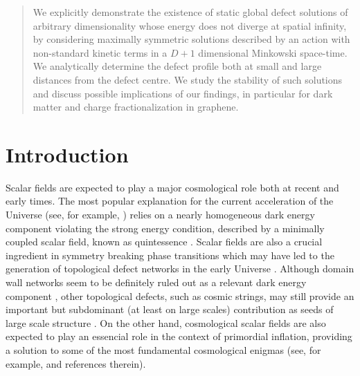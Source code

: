 \documentclass[prd,twocolumn,a4paper,superscriptaddress,floatfix]{revtex4}
\begin{document}
\begin{abstract}

We explicitly demonstrate the existence of static global defect solutions of arbitrary dimensionality whose energy does not diverge at spatial infinity, by considering maximally symmetric solutions described by an action with non-standard kinetic terms in a $D+1$ dimensional  Minkowski space-time. We analytically determine the defect profile both at small and large distances from the defect centre. We study the stability of such solutions and discuss possible implications of our findings, in particular for dark matter and charge fractionalization in graphene.

\end{abstract} 
\maketitle

\section{Introduction}

Scalar fields are expected to play a major cosmological role both at recent and early times. The most popular explanation for the current acceleration of the Universe (see, for example, \cite{Frieman:2008sn,Komatsu:2010fb}) relies on a nearly homogeneous dark energy component violating the strong energy condition, described by a minimally coupled scalar field, known as quintessence \cite{Zlatev:1998tr}. Scalar fields are also a crucial ingredient in symmetry breaking phase transitions which may have led to the generation of topological defect networks in the early Universe \cite{1994csot.book.....V}. Although domain wall networks seem to be definitely ruled out as a relevant dark energy component \cite{PinaAvelino:2006ia,Avelino:2008ve,Sousa:2009is}, other topological defects, such as cosmic strings, may still provide an important but subdominant (at least on large scales) contribution as seeds of large scale structure \cite{Wu:1998mr,Avelino:2003nn,Bevis:2007gh}. On the other hand, cosmological scalar fields are also expected to play an essencial role in the context of primordial inflation, providing a solution to some of the most fundamental cosmological enigmas (see, for example, \cite{Olive:1989nu} and references therein).
\end{document}
